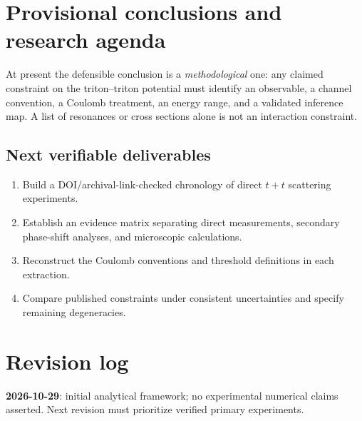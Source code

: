\section{Provisional conclusions and research agenda}\label{sec:tt-conclusion}
At present the defensible conclusion is a \emph{methodological} one: any claimed constraint on the triton--triton potential must identify an observable, a channel convention, a Coulomb treatment, an energy range, and a validated inference map. A list of resonances or cross sections alone is not an interaction constraint.

\subsection{Next verifiable deliverables}
\begin{enumerate}
\item Build a DOI/archival-link-checked chronology of direct $t+t$ scattering experiments.
\item Establish an evidence matrix separating direct measurements, secondary phase-shift analyses, and microscopic calculations.
\item Reconstruct the Coulomb conventions and threshold definitions in each extraction.
\item Compare published constraints under consistent uncertainties and specify remaining degeneracies.
\end{enumerate}

\section*{Revision log}
\textbf{2026-10-29}: initial analytical framework; no experimental numerical claims asserted. Next revision must prioritize verified primary experiments.

